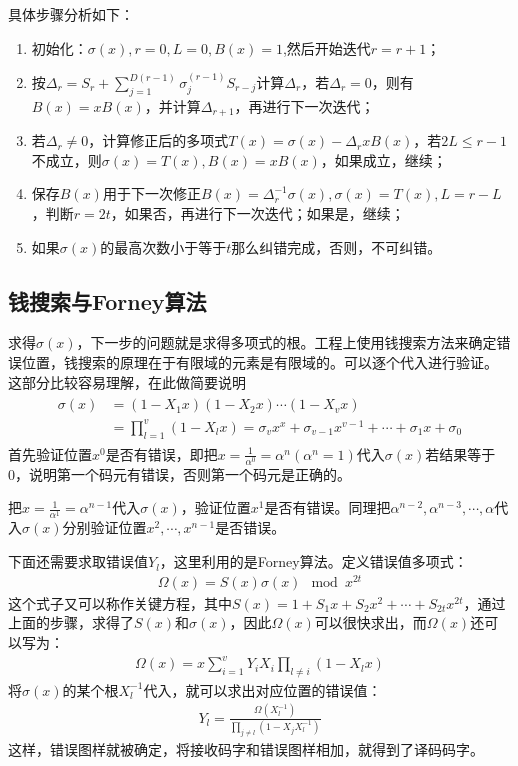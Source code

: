 具体步骤分析如下：
\begin{enumerate}
  \item 初始化：$\sigma(x),r=0,L=0,B(x)=1$,然后开始迭代$r=r+1$；
  \item
    按$\Delta_r=S_r+\sum_{j=1}^{D(r-1)}\sigma_j^{(r-1)}S_{r-j}$计算$\Delta_r$，若$\Delta_r=0$，则有$B(x)=xB(x)$，并计算$\Delta_{r+1}$，再进行下一次迭代；
  \item 若$\Delta_r\neq
    0$，计算修正后的多项式$T(x)=\sigma(x)-\Delta_rxB(x)$，若$2L\le
    r-1$不成立，则$\sigma(x)=T(x),B(x)=xB(x)$，如果成立，继续；
  \item
    保存$B(x)$用于下一次修正$B(x)=\Delta_r^{-1}\sigma(x),\sigma(x)=T(x),L=r-L$，判断$r=2t$，如果否，再进行下一次迭代；如果是，继续；
  \item 如果$\sigma(x)$的最高次数小于等于$t$那么纠错完成，否则，不可纠错。
\end{enumerate}
\subsection{钱搜索与Forney算法}
求得$\sigma(x)$，下一步的问题就是求得多项式的根。工程上使用钱搜索方法来确定错误位置，钱搜索的原理在于有限域的元素是有限域的。可以逐个代入进行验证。
这部分比较容易理解，在此做简要说明
\begin{eqnarray}
  \begin{array}{ll}
  \sigma(x)&=(1-X_1x)(1-X_2x)\cdots (1-X_vx)\\
  &=\prod\limits_{l=1}^v(1-X_lx)=\sigma_vx^x+\sigma_{v-1}x^{v-1}+\cdots
  +\sigma_1x+\sigma_0
\end{array}
  \label{equ:4.25}
\end{eqnarray}
首先验证位置$x^0$是否有错误，即把$x=\frac{1}{\alpha^0}=\alpha^n(\alpha^n=1)$代入$\sigma(x)$若结果等于0，说明第一个码元有错误，否则第一个码元是正确的。

把$x=\frac{1}{\alpha^1}=\alpha^{n-1}$代入$\sigma(x)$，验证位置$x^1$是否有错误。同理把$\alpha^{n-2},\alpha^{n-3},\cdots
,\alpha$代入$\sigma(x)$分别验证位置$x^2,\cdots ,x^{n-1}$是否错误。

下面还需要求取错误值$Y_l$，这里利用的是Forney算法。定义错误值多项式：
\begin{eqnarray}
  \Omega(x)=S(x)\sigma(x)\mod x^{2t}
  \label{equ:4.26}
\end{eqnarray}
这个式子又可以称作关键方程，其中$S(x)=1+S_1x+S_2x^2+\cdots
+S_{2t}x^{2t}$，通过上面的步骤，求得了$S(x)$和$\sigma(x)$，因此$\Omega(x)$可以很快求出，而$\Omega(x)$还可以写为\cite{Blahut_BM}：
\begin{eqnarray}
  \Omega(x)=x\sum_{i=1}^vY_iX_i\prod\limits_{l\neq i}(1-X_lx)
  \label{equ:4.27}
\end{eqnarray}
将$\sigma(x)$的某个根$X_l^{-1}$代入，就可以求出对应位置的错误值：
\begin{eqnarray}
  Y_l=\frac{\Omega(X_l^{-1})}{\prod\limits_{j\neq l}(1-X_jX_l^{-1})}
  \label{equ:4.28}
\end{eqnarray}
这样，错误图样就被确定，将接收码字和错误图样相加，就得到了译码码字。

